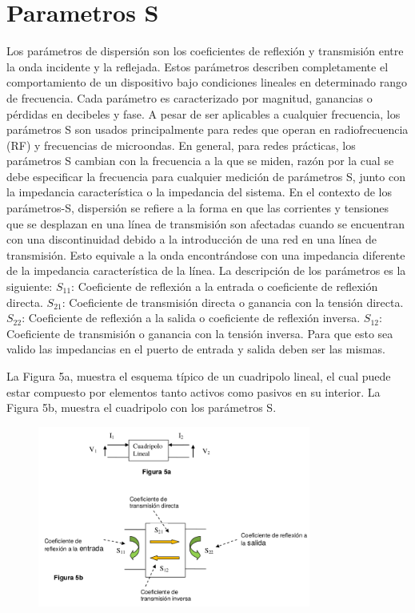 \documentclass[a4paper,12pt,twoside]{article}
\begin{document}
\section{Parametros S}
Los parámetros de dispersión son los coeficientes de reflexión y transmisión entre la
onda incidente y la reflejada. Estos parámetros describen completamente el comportamiento
de un dispositivo bajo condiciones lineales en determinado rango de frecuencia. Cada
parámetro es caracterizado por magnitud, ganancias o pérdidas en decibeles y fase. A
pesar de ser aplicables a cualquier frecuencia, los parámetros S son usados principalmente
para redes que operan en radiofrecuencia (RF) y frecuencias de microondas. En general, para
redes prácticas, los parámetros S cambian con la frecuencia a la que se miden, razón por la
cual se debe especificar la frecuencia para cualquier medición de parámetros S, junto con la
impedancia característica o la impedancia del sistema.
En el contexto de los parámetros-S, dispersión se refiere a la forma en que las corrientes y
tensiones que se desplazan en una línea de transmisión son afectadas cuando se
encuentran con una discontinuidad debido a la introducción de una red en una línea de
transmisión. Esto equivale a la onda encontrándose con una impedancia diferente de la
impedancia característica de la línea.
La descripción de los parámetros es la siguiente:
\newline
$S_{11}$: Coeficiente de reflexión a la entrada o coeficiente de reflexión directa.
\newline
$S_{21}$: Coeficiente de transmisión directa o ganancia con la tensión directa.
\newline
$S_{22}$: Coeficiente de reflexión a la salida o coeficiente de reflexión inversa.
\newline
$S_{12}$: Coeficiente de transmisión o ganancia con la tensión inversa.
Para que esto sea valido las impedancias en el puerto de entrada y salida deben ser las
mismas.

La Figura 5a, muestra el esquema típico de un cuadripolo lineal, el cual puede estar
compuesto por elementos tanto activos como pasivos en su interior. La Figura 5b, muestra el
cuadripolo con los parámetros S.

\begin{figure}[H]
    \centering
    \includegraphics[width=0.8\textwidth]{../img/parametros_s.png}
\end{figure}
\end{document}
